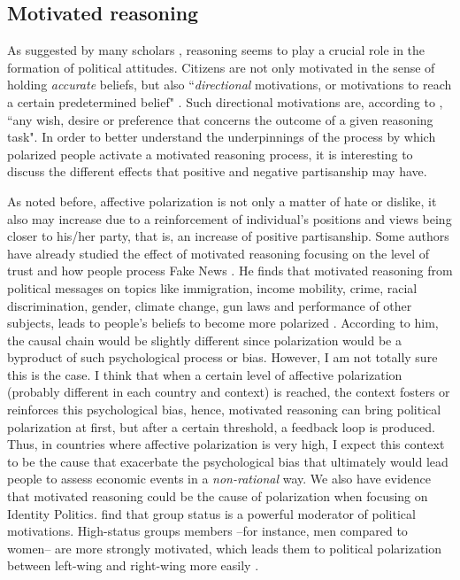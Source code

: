 \documentclass[a4paper, svgnames]{article}
\begin{document}
\subsection{Motivated reasoning}

As suggested by many scholars \citep{Taber2006, Boyer}, reasoning seems to play a crucial role in the formation of political attitudes. Citizens are not only motivated in the sense of holding \textit{accurate} beliefs, but also ``\textit{directional} motivations, or motivations to reach a certain predetermined belief" \citep[p.2]{Boyer}. Such directional motivations are, according to \cite[p. 440]{Kunda1990}, ``any wish, desire or preference that concerns the outcome of a given reasoning task". In order to better understand the underpinnings of the process by which polarized people activate a motivated reasoning process, it is interesting to discuss the different effects that positive and negative partisanship may have.

As noted before, affective polarization is not only a matter of hate or dislike, it also may increase due to a reinforcement of individual's positions and views being closer to his/her party, that is, an increase of positive partisanship. Some authors have already studied the effect of motivated reasoning focusing on the level of trust and how people process Fake News \citep{Thaler2021}. He finds that motivated reasoning from political messages on topics like immigration, income mobility, crime, racial discrimination, gender, climate change, gun laws and performance of other subjects, leads to people's beliefs to become more polarized \citep{Thaler2021}. According to him, the causal chain would be slightly different since polarization would be a byproduct of such psychological process or bias. However, I am not totally sure this is the case. I think that when a certain level of affective polarization (probably different in each country and context) is reached, the context fosters or reinforces this psychological bias, hence, motivated reasoning can bring political polarization at first, but after a certain threshold, a feedback loop is produced. Thus, in countries where affective polarization is very high, I expect this context to be the cause that exacerbate the psychological bias that ultimately would lead people to assess economic events in a \textit{non-rational} way. We also have evidence that motivated reasoning could be the cause of polarization when focusing on Identity Politics. \cite{Boyer} find that group status is a powerful moderator of political motivations. High-status groups members --for instance, men compared to women-- are more strongly motivated, which leads them to political polarization between left-wing and right-wing more easily \citep{Boyer}.
\end{document}
